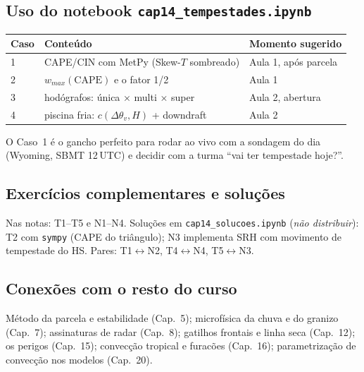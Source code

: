\subsection*{Uso do notebook \texttt{cap14\_tempestades.ipynb}}

\begin{center}
\begin{tabular}{lll}
\hline
Caso & Conteúdo & Momento sugerido \\
\hline
1 & CAPE/CIN com MetPy (Skew-$T$ sombreado) & Aula 1, após parcela \\
2 & $w_{max}(\mathrm{CAPE})$ e o fator 1/2 & Aula 1 \\
3 & hodógrafos: única × multi × super & Aula 2, abertura \\
4 & piscina fria: $c(\Delta\theta_v, H)$ + downdraft & Aula 2 \\
\hline
\end{tabular}
\end{center}

O Caso~1 é o gancho perfeito para rodar ao vivo com a sondagem do dia
(Wyoming, SBMT 12\,UTC) e decidir com a turma ``vai ter tempestade
hoje?''.

\subsection*{Exercícios complementares e soluções}

Nas notas: T1--T5 e N1--N4. Soluções em \texttt{cap14\_solucoes.ipynb}
(\emph{não distribuir}): T2 com \texttt{sympy} (CAPE do triângulo);
N3 implementa SRH com movimento de tempestade do HS. Pares:
T1$\leftrightarrow$N2, T4$\leftrightarrow$N4, T5$\leftrightarrow$N3.

\subsection*{Conexões com o resto do curso}

Método da parcela e estabilidade (Cap.~5); microfísica da chuva e do
granizo (Cap.~7); assinaturas de radar (Cap.~8); gatilhos frontais e
linha seca (Cap.~12); os perigos (Cap.~15); convecção tropical e
furacões (Cap.~16); parametrização de convecção nos modelos (Cap.~20).
